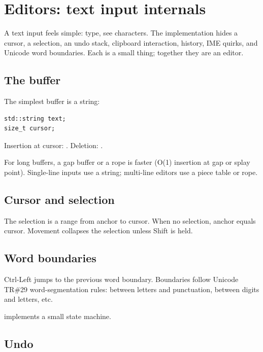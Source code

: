 \chapter{Editors: text input internals}
\label{ch:editors}

\begin{aside}
A text input feels simple: type, see characters. The
implementation hides a cursor, a selection, an undo stack,
clipboard interaction, history, IME quirks, and Unicode word
boundaries. Each is a small thing; together they are an
editor.
\end{aside}

\section{The buffer}

The simplest buffer is a string:

\begin{lstlisting}
std::string text;
size_t cursor;
\end{lstlisting}

Insertion at cursor: .
Deletion: .

For long buffers, a gap buffer or a rope is faster (O(1)
insertion at gap or splay point). Single-line inputs use a
string; multi-line editors use a piece table or rope.

\section{Cursor and selection}

The selection is a range from anchor to cursor.
When no selection, anchor equals cursor. Movement
collapses the selection unless Shift is held.

\section{Word boundaries}

Ctrl-Left jumps to the previous word boundary.
Boundaries follow Unicode TR\#29 word-segmentation rules:
between letters and punctuation, between digits and
letters, etc.

\maya{} implements a small state machine.

\section{Undo}


